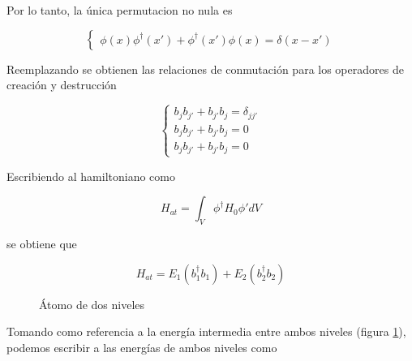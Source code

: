 Por lo tanto, la única permutacion no nula es 

\begin{equation}
	\begin{cases}
		\phi(x)\phi^{\dagger}(x')+\phi^{\dagger}(x')\phi(x)=\delta(x-x')
	\end{cases}
	\label{eq: pauli 1}
\end{equation}

Reemplazando se obtienen las relaciones de conmutación para los operadores de creación y destrucción

\begin{equation}
	\begin{cases}
		b_jb_{j'}+b_{j'}b_j=\delta_{j j'}\\
		b_jb_{j'}+b_{j'}b_j=0\\
		b_jb_{j'}+b_{j'}b_j=0
	\end{cases}
\label{eq: pauli 2}
\end{equation}

Escribiendo  al hamiltoniano como 

\[ H_{at}=\int_{V}\phi^{\dagger} H_0 \phi' dV
\]

se obtiene que 

\begin{equation}
	 H_{at}=E_1(b^{\dagger}_1b_1)+E_2(b^{\dagger}_2b_2)
	 \label{eq: h at 1}
\end{equation}


\begin{figure}[htc]
	\begin{center}
		
		\caption{Átomo de dos niveles}
		\label{fig: two level}
	\end{center}
\end{figure} 

Tomando como referencia a la energía intermedia entre ambos niveles (figura \ref{fig: two level}), podemos escribir a las energías de ambos niveles    como  

